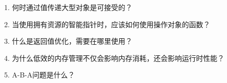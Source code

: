 \begin{enumerate}
\item 
何时通过值传递大型对象是可接受的？

\item 
当使用拥有资源的智能指针时，应该如何使用操作对象的函数？

\item 
什么是返回值优化，需要在哪里使用？

\item
为什么低效的内存管理不仅会影响内存消耗，还会影响运行时性能？

\item 
A-B-A问题是什么？

\end{enumerate}